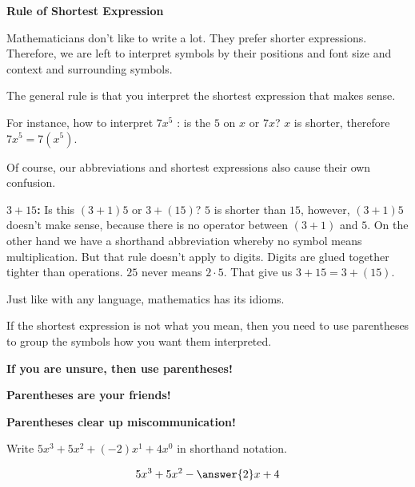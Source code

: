 \documentclass{ximera}
\begin{document}
\begin{warning} \textbf{\textcolor{red!70!darkgray}{Rule of Shortest Expression}} 

Mathematicians don't like to write a lot.  They prefer shorter expressions.  Therefore, we are left to interpret symbols by their positions and font size and context and surrounding symbols. 

The general rule is that you interpret the shortest expression that makes sense. 


For instance, how to interpret $7x^5$ : is the $5$ on $x$ or $7x$?  $x$ is shorter, therefore $7x^5 = 7 (x^5)$. 

Of course, our abbreviations and shortest expressions also cause their own confusion.

\textbf{$3+15$:} Is this $(3+1)5$ or $3+(15)$?  $5$ is shorter than $15$, however, $(3+1)5$ doesn't make sense, because there is no operator between $(3+1)$ and $5$.  On the other hand we have a shorthand abbreviation whereby no symbol means multiplication.  But that rule doesn't apply to digits.  Digits are glued together tighter than operations. $25$ never means $2 \cdot 5$. That give us $3 + 15 = 3 + (15)$. 

Just like with any language, mathematics has its idioms.

If the shortest expression is not what you mean, then you need to use parentheses to group the symbols how you want them interpreted.

\begin{center}
\textbf{\textcolor{red!70!darkgray}{If you are unsure, then use parentheses!}} 
\end{center}


\begin{center}
\textbf{\textcolor{red!70!darkgray}{Parentheses are your friends!}} 
\end{center}


\begin{center}
\textbf{\textcolor{red!70!darkgray}{Parentheses clear up miscommunication!}} 
\end{center}



\end{warning}



\begin{question}

Write $5 x^3 + 5 x^2 + (-2) x^1 + 4 x^0$ in shorthand notation.


\[
5 x^3 + 5 x^2 - \answer{2} x + 4  
\]

\end{question}
\end{document}
